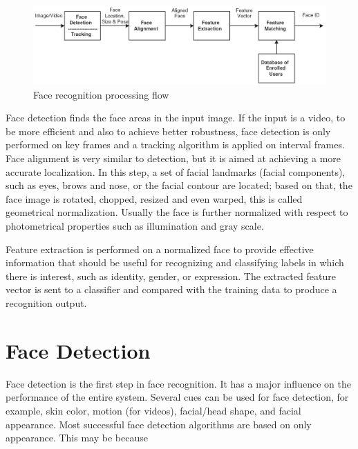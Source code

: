 \documentclass[12pt]{report}
\begin{document}
\begin{figure}[h]
    \centering
    \includegraphics[width=\textwidth]{img/processingFlow.png}
    \caption{Face recognition processing flow}
    \label{fig:processingFlow}
\end{figure}

Face detection finds the face areas in the input image. If the input is a video, to be more efficient and also to achieve better robustness, face detection is only performed on key frames and a tracking algorithm is applied on interval frames. Face alignment is very similar to detection, but it is aimed at achieving a more accurate localization. In this step, a set of facial landmarks (facial components), such as eyes, brows and nose, or the facial contour are located; based on that, the face image is rotated, chopped, resized and even warped, this is called geometrical normalization. Usually the face is further normalized with respect to photometrical properties such as illumination and gray scale.

Feature extraction is performed on a normalized face to provide effective information that should be useful for recognizing and classifying labels in which there is interest, such as identity, gender, or expression. The extracted feature vector is sent to a classifier and compared with the training data to produce a recognition output.

\section{Face Detection}
Face detection is the first step in face recognition. It has a major influence on the performance of the entire system. Several cues can be used for face detection, for example, skin color, motion (for videos), facial/head shape, and facial appearance. Most successful face detection algorithms are based on only appearance. This may be because
\end{document}
